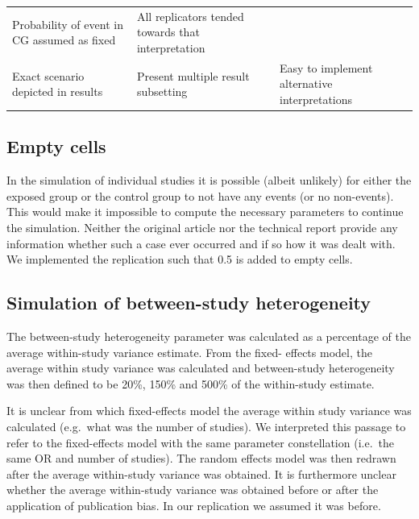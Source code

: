 \documentclass[
  english,
  doc,floatsintext,draftall]{apa6}
\begin{document}
\begin{longtable}[]{@{}lll@{}}
\begin{minipage}[t]{0.33\columnwidth}
Probability of event in CG assumed as fixed\strut
\end{minipage} & \begin{minipage}[t]{0.25\columnwidth}\raggedright
All replicators tended towards that interpretation\strut
\end{minipage}\tabularnewline
\begin{minipage}[t]{0.33\columnwidth}\raggedright
Exact scenario depicted in results\strut
\end{minipage} & \begin{minipage}[t]{0.33\columnwidth}\raggedright
Present multiple result subsetting\strut
\end{minipage} & \begin{minipage}[t]{0.25\columnwidth}\raggedright
Easy to implement alternative interpretations\strut
\end{minipage}\tabularnewline
\bottomrule
\end{longtable}

\hypertarget{empty-cells}{%
\subsection{Empty cells}\label{empty-cells}}

In the simulation of individual studies it is possible (albeit unlikely) for either the exposed group or the control group to not have any events (or no non-events).
This would make it impossible to compute the necessary parameters to continue the simulation.
Neither the original article nor the technical report provide any information whether such a case ever occurred and if so how it was dealt with.
We implemented the replication such that 0.5 is added to empty cells.

\hypertarget{simulation-of-between-study-heterogeneity}{%
\subsection{Simulation of between-study heterogeneity}\label{simulation-of-between-study-heterogeneity}}

The between-study heterogeneity parameter was calculated as a percentage of the average within-study variance estimate. From the fixed- effects model, the average within study variance was calculated and between-study heterogeneity was then defined to be 20\%, 150\% and 500\% of the within-study estimate.

It is unclear from which fixed-effects model the average within study variance was calculated (e.g.~what was the number of studies).
We interpreted this passage to refer to the fixed-effects model with the same parameter constellation (i.e.~the same OR and number of studies).
The random effects model was then redrawn after the average within-study variance was obtained.
It is furthermore unclear whether the average within-study variance was obtained before or after the application of publication bias.
In our replication we assumed it was before.
\end{document}
